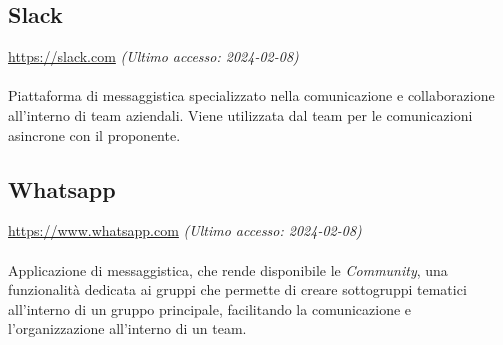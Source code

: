 \documentclass[10pt, a4paper]{article}
\begin{document}
\subsection{Slack}
\href{https://slack.com}{https://slack.com} \textit{(Ultimo accesso: 2024-02-08)}\\\\
Piattaforma di messaggistica specializzato nella comunicazione e collaborazione all'interno di team aziendali. Viene utilizzata dal team per le comunicazioni asincrone con il proponente.

\subsection{Whatsapp}
\href{https://www.whatsapp.com}{https://www.whatsapp.com} \textit{(Ultimo accesso: 2024-02-08)}\\\\
Applicazione di messaggistica, che rende disponibile le \textit{Community}, una funzionalità dedicata ai gruppi che permette di creare sottogruppi tematici all’interno di un 
gruppo principale, facilitando la comunicazione e l’organizzazione all'interno di un team.
\end{document}
